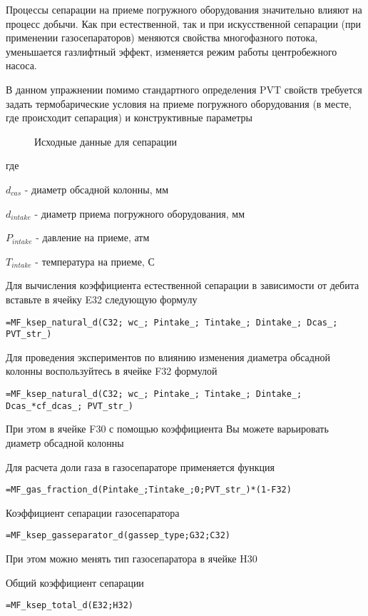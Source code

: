 Процессы сепарации на приеме погружного оборудования значительно влияют на процесс добычи. Как при естественной, так и при искусственной сепарации (при применении газосепараторов) меняются свойства многофазного потока, уменьшается газлифтный эффект, изменяется режим работы центробежного насоса.

В данном упражнении помимо стандартного определения PVT свойств требуется задать термобарические условия на приеме погружного оборудования (в месте, где происходит сепарация) и конструктивные параметры


\begin{figure}[h!]
	\center{\texttt{[image: Ex60\_1]}}
	\caption{Исходные данные для сепарации}
	\label{ris:Ex60_1}
\end{figure}

где

$d_{cas}$ - диаметр обсадной колонны, мм

$d_{intake}$ - диаметр приема погружного оборудования, мм

$P_{intake}$ - давление на приеме, атм

$T_{intake}$ - температура на приеме, С

Для вычисления коэффициента естественной сепарации в зависимости от дебита вставьте в ячейку E32 следующую формулу 

{ \small  \texttt{=MF\_ksep\_natural\_d(C32; wc\_; Pintake\_; Tintake\_; Dintake\_; Dcas\_; PVT\_str\_)}}

Для проведения экспериментов по влиянию изменения диаметра обсадной колонны воспользуйтесь в ячейке F32 формулой

{ \small  \texttt{=MF\_ksep\_natural\_d(C32; wc\_; Pintake\_; Tintake\_; Dintake\_; Dcas\_*cf\_dcas\_; PVT\_str\_)}}

При этом в ячейке F30 с помощью коэффициента Вы можете варьировать диаметр обсадной колонны

Для расчета доли газа в газосепараторе применяется функция

{ \small  \texttt{=MF\_gas\_fraction\_d(Pintake\_;Tintake\_;0;PVT\_str\_)*(1-F32)
}}

Коэффициент сепарации газосепаратора

{ \small  \texttt{=MF\_ksep\_gasseparator\_d(gassep\_type;G32;C32)
}}

При этом можно менять тип газосепаратора в ячейке H30

Общий коэффициент сепарации

{ \small  \texttt{=MF\_ksep\_total\_d(E32;H32)
}}

